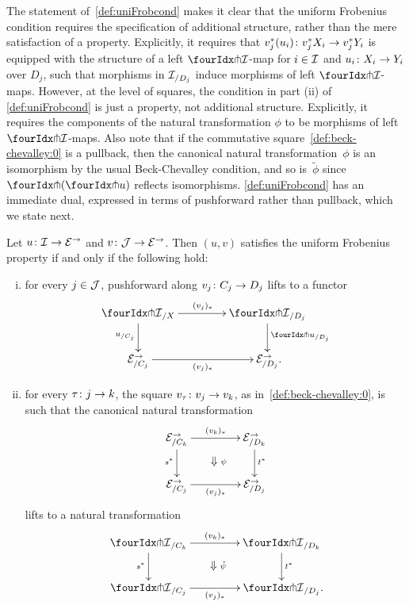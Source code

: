 \documentclass[reqno,10pt,a4paper,oneside,draft]{amsart}
\begin{document}
{{The statement of~\cref{def:uniFrobcond} makes it clear that the uniform Frobenius condition requires the specification of additional structure, rather than the mere satisfaction of a property.
Explicitly, it requires that $v_j^*(u_i) \co v_j^* X_i \to v_j^* Y_i$ is equipped with the structure of a left $\liftr{\cal{I}}$-map for $i \in \cal{I}$ and $u_i \co X_i \to Y_i$ over $D_j$, such that morphisms in $\cal{I}_{/D_j}$ induce morphisms of left $\liftr{\cal{I}}$-maps. However, at the level of squares, 
 the  condition in part (ii) of \cref{def:uniFrobcond} is just a property, not additional structure.
Explicitly, it requires the components of the natural transformation $\phi$ to be morphisms of left $\liftr{\cal{I}}$-maps.
Also note that if the commutative square~\eqref{def:beck-chevalley:0} is a pullback, then the canonical natural transformation~$\phi$ is an isomorphism by the usual Beck-Chevalley condition, and so is~$\tilde{\phi}$ since $\liftl{(\liftr{u})}$ reflects isomorphisms.
\cref{def:uniFrobcond} has an immediate dual, expressed in terms of pushforward rather than pullback, which we state next.


\begin{proposition} \label{lift-pushforward} \label{lift-pushforward-BC}
 Let $u \co \cal{I} \to \catE^\to$ and $v \co \cal{J} \to \catE^\to$. Then $(u, v)$ satisfies the
uniform Frobenius property if and only if the following hold:
\begin{enumerate}[(i)] 
\item for every  $j \in \cal{J}$, pushforward along $v_j \co C_j \to D_j$ lifts to a functor
\[
\xymatrix@C=1.5cm{
  {\liftr{\cal{I}}}_{/X}
  \ar[r]^{(v_j)_*}
  \ar[d]_{u_{/C_j}}
&
  {\liftr{\cal{I}}}_{/D_j}
  \ar[d]^{{\liftr{u}}_{/D_j}}
\\
  \catE_{/C_j}^\to
  \ar[r]_{(v_j)_*}
&
  \catE_{/D_j}^\to
\rlap{.}}
\]
\item for every $\tau \co j \to k$, the square $v_\tau \co v_j \to v_k$, as in~\eqref{def:beck-chevalley:0}, is such that the canonical natural transformation
\[
\xymatrix@C+2em{
  \catE^\to_{/C_k}
  \ar[r]^{(v_k)_*}
  \ar[d]_{s^*}
  \ar@{}[dr]|{\textstyle\Downarrow \rlap{$\labelstyle\psi$}}
&
  \catE^\to_{/D_k}
  \ar[d]^{t^*}
\\
  \catE^\to_{/C_j}
  \ar[r]_{(v_j)_*}
&
  \catE^\to_{/D_j}
}
\]
lifts to a natural transformation
\[
\xymatrix@C+2em{
  {\liftr{\cal{I}}}_{/C_k}
  \ar[r]^{(v_k)_*}
  \ar[d]_{s^*}
  \ar@{}[dr]|{\textstyle\Downarrow \rlap{$\labelstyle\tilde{\psi}$}}
&
  {\liftr{\cal{I}}}_{/D_k}
  \ar[d]^{t^*}
\\
  {\liftr{\cal{I}}}_{/C_j}
  \ar[r]_{(v_j)_*}
&
  {\liftr{\cal{I}}}_{/D_j}
\rlap{.}}
\]
\end{enumerate}
\end{proposition}

}}
\end{document}
